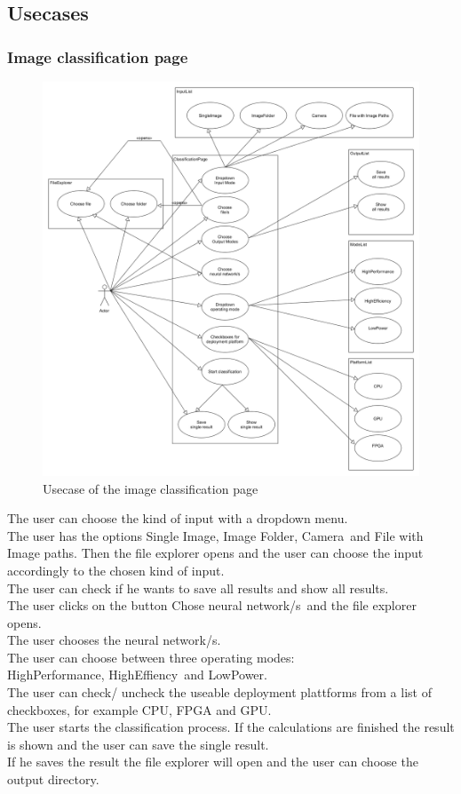 \documentclass[parskip=full]{scrartcl}
\begin{document}
\subsection{Usecases}
\subsubsection{Image classification page}
\begin{figure}[htb!]
\centering
\includegraphics[width=\textwidth]{ClassificationUsecase}
\caption{Usecase of the \gls{image classification} page}
\end{figure}
The user can choose the kind of input with a dropdown menu. \\
The user has the options \glqq Single Image\grqq, \glqq Image Folder\grqq, \glqq Camera\grqq\ and \glqq File with Image paths\grqq. Then the file explorer opens and the user can choose the input accordingly to the chosen kind of input.\\
The user can check if he wants to save all results and show all results.\\
The user clicks on the button \glqq Chose neural network/s\grqq\ and the file explorer opens.\\
The user chooses the neural network/s.\\
The user can choose between three operating modes:\\
\glqq HighPerformance\grqq, \glqq HighEffiency\grqq\ and \glqq LowPower\grqq.\\
The user can check/ uncheck the useable deployment plattforms from a list of checkboxes, for example CPU, FPGA and GPU. \\
The user starts the classification process. If the calculations are finished the result is shown and the user can save the single result.\\
If he saves the result the file explorer will open and the user can choose the output directory. 
\clearpage
\end{document}
